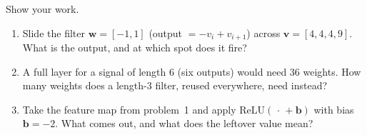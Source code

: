 \documentclass[10pt]{article}
\newcommand{\vv}{\mathbf{v}}
\newcommand{\bb}{\mathbf{b}}
\newcommand{\ww}{\mathbf{w}}
\newcommand{\relu}{\mathrm{ReLU}}
\begin{document}
\begin{practicebox}
Show your work.
\begin{enumerate}[leftmargin=1.6em, itemsep=4pt]
  \item Slide the filter $\ww=[-1,1]$ (output $=-v_i+v_{i+1}$) across $\vv=[4,4,4,9]$. What is the output, and at which spot does it fire? \writeline
  \item A full layer for a signal of length $6$ (six outputs) would need $36$ weights. How many weights does a length-$3$ filter, reused everywhere, need instead? \writeline
  \item Take the feature map from problem~1 and apply $\relu(\,\cdot\,+\bb)$ with bias $\bb=-2$. What comes out, and what does the leftover value mean? \writeline
\end{enumerate}
\end{practicebox}
\end{document}
